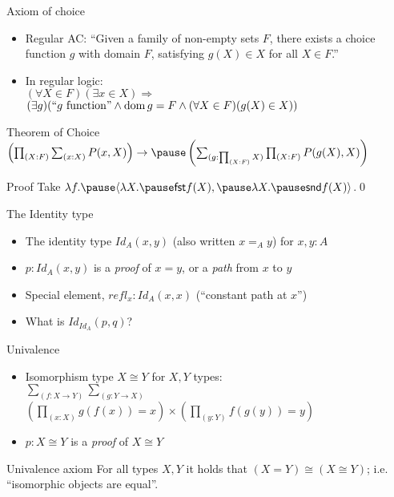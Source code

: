 \documentclass{beamer}
\newcommand{\bra}[1]{\langle #1\rangle}
\newcommand{\fst}{\mathsf{fst }}
\newcommand{\snd}{\mathsf{snd }}
\DeclareMathOperator{\dom}{dom}
\begin{document}
\begin{frame}{Axiom of choice}
	\begin{itemize}
	\pause\item Regular AC: ``Given a family of non-empty sets $F$, there exists a choice function $g$ with domain $F$, satisfying $g(X)\in X$ for all $X\in F$.''
	\pause\item In regular logic:\\
		$(\forall X\in F)(\exists x\in X)\Rightarrow$\\
		$(\exists g)(``g\text{ function}"\land\dom g=F\land(\forall X\in F)(g(X)\in X))$
	\end{itemize}
	\pause\begin{block}{Theorem of Choice}
	$\left(\prod_{(X:F)}\sum_{(x:X)}P(x,X)\right)\to\pause\left(\sum_{(g:\prod_{(X:F)}X)}\prod_{(X:F)}P(g(X),X)\right)$
	\end{block}
	\pause\begin{block}{Proof}
	Take $\lambda f.\pause\bra{\lambda X.\pause\fst f(X),\pause\lambda X.\pause\snd f(X)}$.\pause\qed
	\end{block}
\end{frame}

\begin{frame}{The Identity type}
	\begin{itemize}
	\pause\item The identity type $Id_A(x,y)$ (also written $x=_Ay$) for $x,y : A$ %
	\pause\item $p:Id_A(x,y)$ is a \textit{proof} of $x=y$, or a \textit{path} from $x$ to $y$	
	\pause\item Special element, $refl_x : Id_A(x,x)$ (``constant path at $x$'')
	\pause\item What is $Id_{Id_A}(p,q)$?
	\end{itemize}
\end{frame}

\begin{frame}{Univalence}
	\begin{itemize}
	\pause\item Isomorphism type $X\cong Y$ for $X,Y$ types:\\
		$\sum_{(f:X\to Y)}\sum_{(g:Y\to X)}$\\
		$\left(\prod_{(x:X)}g(f(x))=x\right)\times\left(\prod_{(y:Y)}f(g(y))=y\right)$
	\pause\item $p:X\cong Y$ is a \textit{proof} of $X\cong Y$
	\end{itemize}
	\pause\begin{block}{Univalence axiom}
		For all types $X,Y$ it holds that $(X=Y)\cong(X\cong Y)$; i.e. ``isomorphic objects are equal''.
	\end{block}
\end{frame}
\end{document}
